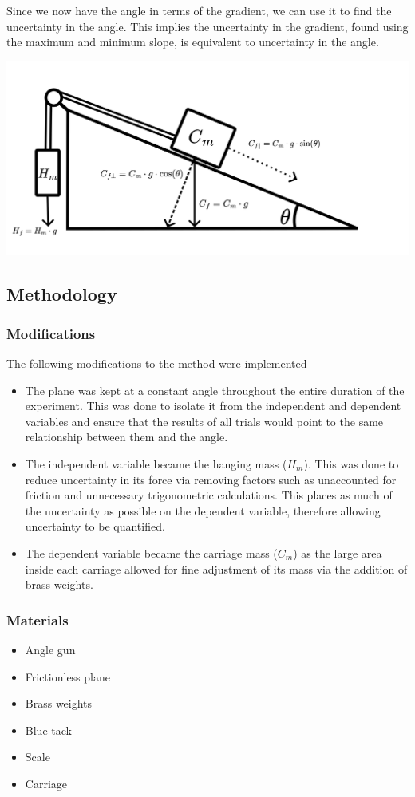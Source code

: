 \documentclass[11pt,a4paper]{article}
\begin{document}
Since we now have the angle in terms of the gradient, we can use it to find the uncertainty in the angle. 
This implies the uncertainty in the gradient, found using the maximum and minimum slope, is equivalent to uncertainty in the angle. 

\includegraphics[width=0.8\paperwidth]{./Diagrams/set_upV2.png}


\subsection{Methodology}

\subsubsection{Modifications}


The following modifications to the method were implemented
\begin{itemize}
	\item The plane was kept at a constant angle throughout the entire duration of the experiment. This was done to isolate it from the independent and dependent variables and ensure that the results of all trials would point to the same relationship between them and the angle.
	\item The independent variable became the hanging mass ($H_m$). This was done to reduce uncertainty in its force via removing factors such as unaccounted for friction and unnecessary trigonometric calculations. This places as much of the uncertainty as possible on the dependent variable, therefore allowing uncertainty to be quantified.
	\item The dependent variable became the carriage mass ($C_m$) as the large area inside each carriage allowed for fine adjustment of its mass via the addition of brass weights. 
\end{itemize}

\subsubsection{Materials}
\begin{itemize}
	\item Angle gun 
	\item Frictionless plane
	\item Brass weights
	\item Blue tack 
	\item Scale
	\item Carriage
\end{itemize}
\end{document}

